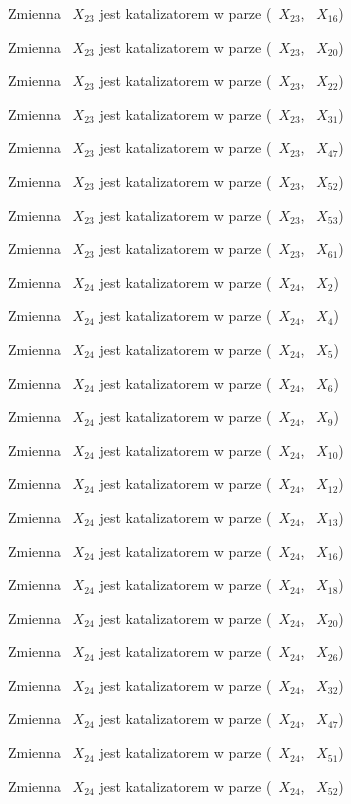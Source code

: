 \documentclass{article}
\begin{document}
Zmienna ~$X_{23}$ jest katalizatorem w parze (~$X_{23}$, ~$X_{16}$)

Zmienna ~$X_{23}$ jest katalizatorem w parze (~$X_{23}$, ~$X_{20}$)

Zmienna ~$X_{23}$ jest katalizatorem w parze (~$X_{23}$, ~$X_{22}$)

Zmienna ~$X_{23}$ jest katalizatorem w parze (~$X_{23}$, ~$X_{31}$)

Zmienna ~$X_{23}$ jest katalizatorem w parze (~$X_{23}$, ~$X_{47}$)

Zmienna ~$X_{23}$ jest katalizatorem w parze (~$X_{23}$, ~$X_{52}$)

Zmienna ~$X_{23}$ jest katalizatorem w parze (~$X_{23}$, ~$X_{53}$)

Zmienna ~$X_{23}$ jest katalizatorem w parze (~$X_{23}$, ~$X_{61}$)

Zmienna ~$X_{24}$ jest katalizatorem w parze (~$X_{24}$, ~$X_{2}$)

Zmienna ~$X_{24}$ jest katalizatorem w parze (~$X_{24}$, ~$X_{4}$)

Zmienna ~$X_{24}$ jest katalizatorem w parze (~$X_{24}$, ~$X_{5}$)

Zmienna ~$X_{24}$ jest katalizatorem w parze (~$X_{24}$, ~$X_{6}$)

Zmienna ~$X_{24}$ jest katalizatorem w parze (~$X_{24}$, ~$X_{9}$)

Zmienna ~$X_{24}$ jest katalizatorem w parze (~$X_{24}$, ~$X_{10}$)

Zmienna ~$X_{24}$ jest katalizatorem w parze (~$X_{24}$, ~$X_{12}$)

Zmienna ~$X_{24}$ jest katalizatorem w parze (~$X_{24}$, ~$X_{13}$)

Zmienna ~$X_{24}$ jest katalizatorem w parze (~$X_{24}$, ~$X_{16}$)

Zmienna ~$X_{24}$ jest katalizatorem w parze (~$X_{24}$, ~$X_{18}$)

Zmienna ~$X_{24}$ jest katalizatorem w parze (~$X_{24}$, ~$X_{20}$)

Zmienna ~$X_{24}$ jest katalizatorem w parze (~$X_{24}$, ~$X_{26}$)

Zmienna ~$X_{24}$ jest katalizatorem w parze (~$X_{24}$, ~$X_{32}$)

Zmienna ~$X_{24}$ jest katalizatorem w parze (~$X_{24}$, ~$X_{47}$)

Zmienna ~$X_{24}$ jest katalizatorem w parze (~$X_{24}$, ~$X_{51}$)

Zmienna ~$X_{24}$ jest katalizatorem w parze (~$X_{24}$, ~$X_{52}$)
\end{document}
